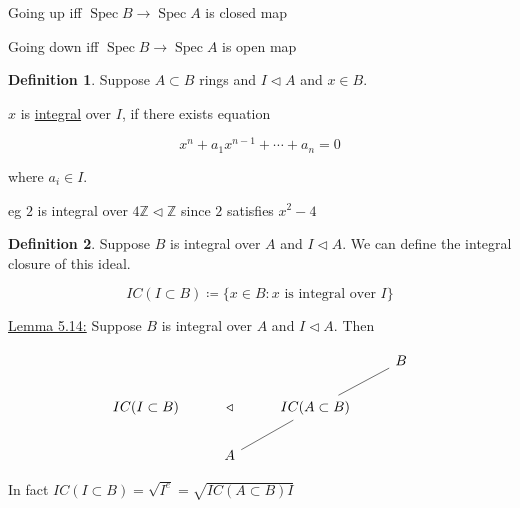 \documentclass{article}
\theoremstyle{definition}
\newtheorem{definition}{Definition}
\begin{document}
\newcommand{\Spec}{\operatorname{Spec}}

Going up iff \(\Spec B \to \Spec A\) is closed map

Going down iff \(\Spec B \to \Spec A\) is open map

\begin{definition}
    Suppose \(A \subset B\) rings and \(I \triangleleft A\) and \(x\in B\).
    
    \(x\) is \underline{integral} over \(I\), if there exists equation

    \[
        x^n + a_1 x^{n-1} + \cdots + a_n = 0
    \]

    where \(a_i\in I\).
\end{definition}

eg \(2\) is integral over \(4\mathbb{Z} \triangleleft \mathbb{Z}\) since \(2\) satisfies \(x^2 - 4\)

\begin{definition}
    Suppose \(B\) is integral over \(A\) and \(I \triangleleft A\). We can define the integral closure of this ideal.

    \[
        IC(I \subset B) \coloneqq \{ x\in B : x \text{ is integral over } I \} 
    \]
\end{definition}

\underline{Lemma 5.14:} Suppose \(B\) is integral over \(A\)  and \(I \triangleleft A \). Then

\[
    \begin{tikzcd}
        & & & B\\
        IC(I \subset B) & \triangleleft & IC (A \subset B) \ar[ur,no head] &\\
        & A \ar[ur, no head] & &
    \end{tikzcd}
\]

In fact \(IC(I \subset B) = \sqrt{I^e} = \sqrt{IC(A \subset B)I}  \) 
\end{document}
